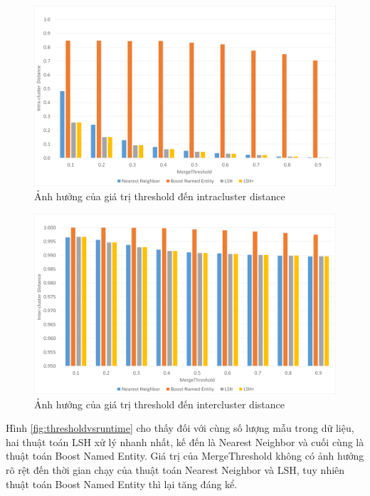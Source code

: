 		\begin{figure}
			\includegraphics[width=0.9\linewidth]{Chapter4/Chapter4Figs/MergeThresholdVSIntraDistance}
			\caption{Ảnh hưởng của giá trị threshold đến intracluster distance}
			\label{fig:thresholdvslocal}
		\end{figure}
		
		\begin{figure}[H]
			\includegraphics[width=0.9\linewidth]{Chapter4/Chapter4Figs/MergeThresholdVSInterDistance}
			\caption{Ảnh hưởng của giá trị threshold đến intercluster distance}
			\label{fig:thresholdvsglobal}
		\end{figure}
	
	Hình \ref{fig:thresholdvsruntime} cho thấy đối với cùng số lượng mẫu trong dữ liệu, hai thuật toán LSH xử lý nhanh nhất, kế đến là Nearest Neighbor và cuối cùng là thuật toán Boost Named Entity. Giá trị của MergeThreshold không có ảnh hưởng rõ rệt đến thời gian chạy của thuật toán Nearest Neighbor và LSH, tuy nhiên thuật toán Boost Named Entity thì lại tăng đáng kể. 
	
